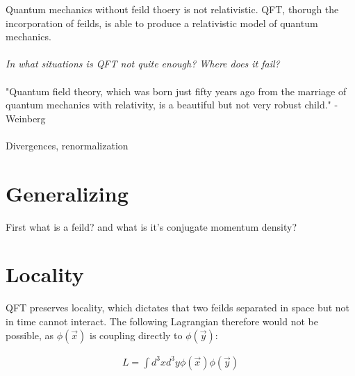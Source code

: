 \documentclass[aps,secnumarabic,nobalancelastpage,amsmath,amssymb,
nofootinbib]{revtex4}
\begin{document}
Quantum mechanics without feild thoery is not relativistic. QFT, thorugh the incorporation of feilds, is able to produce a relativistic model of quantum mechanics.\\\\
\noindent \textit{In what situations is QFT not quite enough? Where does it fail?}\\\\
"Quantum field theory, which was born just fifty years ago from the marriage of quantum mechanics with relativity, is a beautiful but not very robust child." - Weinberg
\\\\
Divergences, renormalization


\section{Generalizing}
First what is a feild? and what is it's conjugate momentum density?

\section{Locality}

QFT preserves locality, which dictates that two feilds separated in space but not in time cannot interact. The following Lagrangian therefore would not be possible, as $\phi(\vec{x})$ is coupling directly to $\phi(\vec{y})$:

\begin{equation}
\begin{split}
L=\int d^3x d^3y \phi(\vec{x}) \phi(\vec{y})\\
\, \label{eq:first-equation}
\end{split}
\end{equation}
\end{document}
